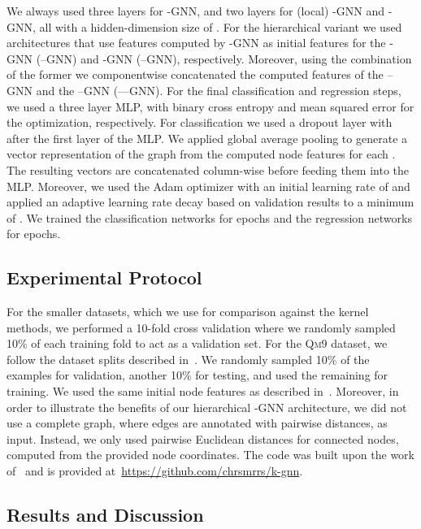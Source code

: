 \documentclass[letterpaper]{article}
\theoremstyle{definition}
\begin{document}
We always used three layers for -GNN, and two layers for (local) -GNN and -GNN, all with a hidden-dimension size of . 
For the hierarchical variant we used architectures that use features computed by -GNN as initial features for the -GNN (--GNN)  and -GNN (--GNN), respectively. 
Moreover, using the combination of the former we componentwise concatenated the computed features of the --GNN and the --GNN (---GNN).
For the final classification and regression steps, we used a three layer MLP, with binary cross entropy and mean squared error for the optimization, respectively.
For classification we used a dropout layer with  after the first layer of the MLP. 
We applied global average pooling to generate a vector representation of the graph from the computed node features for each . 
The resulting vectors are concatenated column-wise before feeding them into the MLP. 
Moreover, we used the Adam optimizer with an initial learning rate of  and applied an adaptive learning rate decay based on validation results to a minimum of .  We trained the classification networks for  epochs and the regression networks for  epochs.

\subsection{Experimental Protocol} 

For the smaller datasets, which we use for comparison against the kernel methods, we performed a 10-fold cross validation where we randomly sampled 10\% of each training fold to act as a validation set.
For the \textsc{Qm9} dataset, we follow the dataset splits described in~\cite{Wu+2018}.
We randomly sampled 10\% of the examples for validation, another 10\% for testing, and used the remaining for training. We used the same initial node features as described in~\cite{Gil+2017}. Moreover, in order to illustrate the benefits of our hierarchical -GNN architecture, we did not use a complete graph, where edges are annotated with pairwise distances, as input.
Instead, we only used pairwise Euclidean distances for connected nodes, computed from the provided node coordinates. The code was built upon the work of~\cite{Fey+2018} and is provided at~\url{https://github.com/chrsmrrs/k-gnn}.


\subsection{Results and Discussion}
\end{document}
